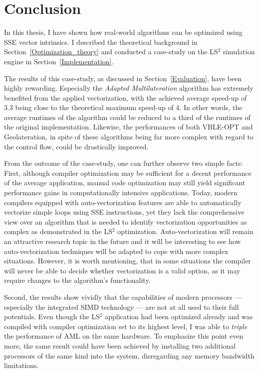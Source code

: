 \section{Conclusion}
\label{Conclusion}
In this thesis, I have shown how real-world algorithms can be optimized using SSE vector intrinsics. I described the theoretical background in Section~\ref{Optimization_theory} and conducted a case-study on the LS$^{2}$ simulation engine in Section~\ref{Implementation}.

The results of this case-study, as discussed in Section~\ref{Evaluation}, have been highly rewarding. Especially the \emph{Adapted Multilateration} algorithm has extremely benefited from the applied vectorization, with the achieved average speed-up of 3.3 being close to the theoretical maximum speed-up of 4. In other words, the average runtimes of the algorithm could be reduced to a third of the runtimes of the original implementation. Likewise, the performances of both VBLE-OPT and Geolateration, in spite of these algorithms being far more complex with regard to the control flow, could be drastically improved.

From the outcome of the case-study, one can further observe two simple facts: First, although compiler optimization may be sufficient for a decent performance of the average application, manual code optimization may still yield significant performance gains in computationally intensive applications. Today, modern compilers equipped with auto-vectorization features are able to automatically vectorize simple loops using SSE instructions, yet they lack the comprehensive view over an algorithm that is needed to identify vectorization opportunities as complex as demonstrated in the LS$^{2}$ optimization. Auto-vectorization will remain an attractive research topic in the future and it will be interesting to see how auto-vectorization techniques will be adapted to cope with more complex situations. However, it is worth mentioning, that in some situations the compiler will never be able to decide whether vectorization is a valid option, as it may require changes to the algorithm's functionality.

Second, the results show vividly that the capabilities of modern processors --- especially the integrated SIMD technology --- are not at all used to their full potentials. Even though the LS$^{2}$ application had been optimized already and was compiled with compiler optimization set to its highest level, I was able to \emph{triple} the performance of AML on the same hardware. To emphasize this point even more, the same result could have been achieved by installing two additional processors of the same kind into the system, disregarding any memory bandwidth limitations. 

